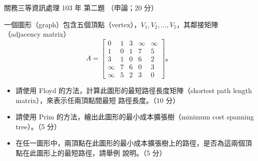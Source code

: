 \begin{pastexam}[label={px:gw3-103-ds-02}]{關務三等資訊處理 103 年 第二題}
（申論；20 分）

一個圖形（graph）包含五個頂點（vertex），$V_1, V_2, \ldots, V_5$，其鄰接矩陣（adjacency matrix）
\[
A = \begin{bmatrix}
0 & 1 & 3 & \infty & \infty \\
1 & 0 & 1 & 7 & 5 \\
3 & 1 & 0 & 6 & 2 \\
\infty & 7 & 6 & 0 & 3 \\
\infty & 5 & 2 & 3 & 0
\end{bmatrix}\text{。}
\]
\begin{itemize}[leftmargin=2.2em]
\item[㈠] 請使用 Floyd 的方法，計算此圖形的最短路徑長度矩陣（shortest path length matrix），來表示任兩頂點間最短
路徑長度。（10 分）
\item[㈡] 請使用 Prim 的方法，繪出此圖形的最小成本擴張樹（minimum cost spanning tree）。（5 分）
\item[㈢] 在任一圖形中，兩頂點在此圖形的最小成本擴張樹上的路徑，是否為這兩個頂點在此圖形上的最短路徑，請舉例
說明。（5 分）
\end{itemize}
\end{pastexam}

